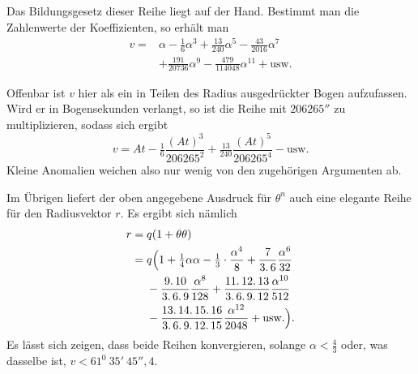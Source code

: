Das Bildungsgesetz dieser Reihe liegt auf der Hand. Bestimmt man die Zahlenwerte der Koeffizienten, so erhält man
\[
\begin{aligned}
v={}&\alpha-\tfrac16\alpha^3+\tfrac{13}{240}\alpha^5-\tfrac{43}{2016}\alpha^7\\
&+\tfrac{191}{20736}\alpha^9-\tfrac{479}{114048}\alpha^{11}+\text{usw.}
\end{aligned}
\]
\par
Offenbar ist \(v\) hier als ein in Teilen des Radius ausgedrückter Bogen aufzufassen. Wird er in Bogensekunden verlangt, so ist die Reihe mit \(206265''\) zu multiplizieren, sodass sich ergibt
\[
v=At-\tfrac16\frac{(At)^3}{206265^2}+\tfrac{13}{240}\frac{(At)^5}{206265^4}-\text{usw.}
\]
Kleine Anomalien weichen also nur wenig von den zugehörigen Argumenten ab.
\par
Im Übrigen liefert der oben angegebene Ausdruck für \(\theta^n\) auch eine elegante Reihe für den Radiusvektor \(r\). Es ergibt sich nämlich
\[
\begin{aligned}
r={}&q(1+\theta\theta)\\
={}&q\Bigl(1+\tfrac14\alpha\alpha-\tfrac13\cdot\frac{\alpha^4}{8}+\frac{7}{3\mathpunct{.}6}\frac{\alpha^6}{32}\\
&-\frac{9\mathpunct{.}10}{3\mathpunct{.}6\mathpunct{.}9}\frac{\alpha^8}{128}
+\frac{11\mathpunct{.}12\mathpunct{.}13}{3\mathpunct{.}6\mathpunct{.}9\mathpunct{.}12}\frac{\alpha^{10}}{512}\\
&-\frac{13\mathpunct{.}14\mathpunct{.}15\mathpunct{.}16}{3\mathpunct{.}6\mathpunct{.}9\mathpunct{.}12\mathpunct{.}15}\frac{\alpha^{12}}{2048}+\text{usw.}\Bigr).
\end{aligned}
\]
Es lässt sich zeigen, dass beide Reihen konvergieren, solange \(\alpha<\tfrac43\) oder, was dasselbe ist, \(v<61^0\ 35'\ 45''{,}4\).
\par
